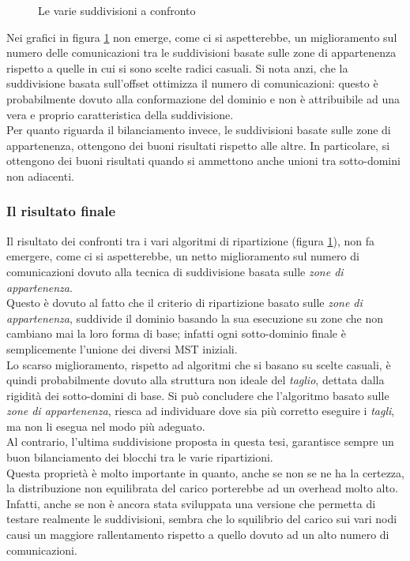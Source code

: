 {\begin{figure}[H]
	\caption{Le varie suddivisioni a confronto}
		\label{fig:comm_confronto}
\end{figure}


Nei grafici in figura \ref{fig:comm_confronto} non emerge, come ci si aspetterebbe, un miglioramento sul numero delle comunicazioni tra le suddivisioni basate sulle zone di appartenenza rispetto a quelle in cui si sono scelte radici casuali. Si nota anzi, che la suddivisione basata sull'offset ottimizza il numero di comunicazioni: questo è probabilmente dovuto alla conformazione del dominio e non è attribuibile ad una vera e proprio caratteristica della suddivisione.\\
Per quanto riguarda il bilanciamento invece, le suddivisioni basate sulle zone di appartenenza, ottengono dei buoni risultati rispetto alle altre. In particolare, si ottengono dei buoni risultati quando si ammettono anche unioni tra sotto-domini non adiacenti.

\subsubsection{Il risultato finale}
Il risultato dei confronti tra i vari algoritmi di ripartizione (figura \ref{fig:comm_confronto}), non fa emergere, come ci si aspetterebbe, un netto miglioramento sul numero di comunicazioni dovuto alla tecnica di suddivisione basata sulle \textit{zone di appartenenza}.\\
Questo è dovuto al fatto che il criterio di ripartizione basato sulle \textit{zone di appartenenza}, suddivide il dominio basando la sua esecuzione su zone che non cambiano mai la loro forma di base; infatti ogni sotto-dominio finale è semplicemente l'unione dei diversi MST iniziali.\\
Lo scarso miglioramento, rispetto ad algoritmi che si basano su scelte casuali, è quindi probabilmente dovuto alla struttura non ideale del \textit{taglio}, dettata dalla rigidità dei sotto-domini di base. Si può concludere che l'algoritmo basato sulle \textit{zone di appartenenza}, riesca ad individuare dove sia più corretto eseguire i \textit{tagli}, ma non li esegua nel modo più adeguato.\\

Al contrario, l'ultima suddivisione proposta in questa tesi, garantisce sempre un buon bilanciamento dei blocchi tra le varie ripartizioni.\\
Questa proprietà è molto importante in quanto, anche se non se ne ha la certezza, la distribuzione non equilibrata del carico porterebbe ad un overhead molto alto. Infatti, anche se non è ancora stata sviluppata una versione che permetta di testare realmente le suddivisioni, sembra che lo squilibrio del carico sui vari nodi causi un maggiore rallentamento rispetto a quello dovuto ad un alto numero di comunicazioni.\\

}
